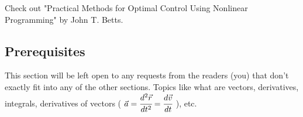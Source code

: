 \documentclass{article}
\begin{document}
\noindent
Check out "Practical Methods for Optimal Control Using Nonlinear Programming" by John T. Betts.

\clearpage

\subsection{Prerequisites}
This section will be left open to any requests from the readers (you) that don't exactly fit into any of the other sections.
Topics like what are vectors, derivatives, integrals,
derivatives of vectors \color{magenta}(
$\vec{a}=\cfrac{d^2\vec{r}}{dt^2}=\cfrac{d\vec{v}}{dt}$
)\color{white}, etc.
\end{document}
